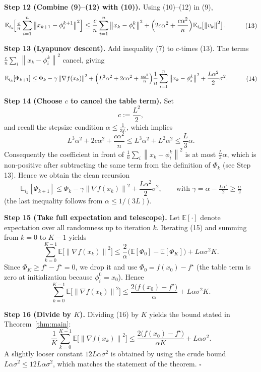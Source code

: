 \documentclass{article}
\newcommand{\E}{\mathbb{E}}
\newcommand{\norm}[1]{\left\|#1\right\|}
\newcommand{\grad}{\nabla}
\begin{document}
\noindent\textbf{Step 12 (Combine (9)–(12) with (10)).}  
Using (10)–(12) in (9),
\[
\begin{aligned}
\E_{i_k}\!\Bigl[\tfrac{c}{n}\sum_{i=1}^{n}\norm{x_{k+1}-\phi_i^{k+1}}^{2}\Bigr]
&\le \frac{c}{n}\sum_{i=1}^{n}\norm{x_k-\phi_i^{k}}^{2}
+ \Bigl(2c\alpha^{2}+\frac{c\alpha^{2}}{n}\Bigr)\E_{i_k}\!\bigl[\norm{v_k}^{2}\bigr].
\end{aligned}
\tag{13}
\]

\noindent\textbf{Step 13 (Lyapunov descent).}  
Add inequality (7) to $c$‑times (13). The terms $\frac{c}{n}\sum_i\norm{x_k-\phi_i^{k}}^{2}$ cancel, giving
\[
\begin{aligned}
\E_{i_k}[\Phi_{k+1}]
&\le \Phi_k
-\gamma \norm{\grad f(x_k)}^{2}
+ \Bigl(L^{3}\alpha^{2}+ 2c\alpha^{2}+\tfrac{c\alpha^{2}}{n}\Bigr)
\frac{1}{n}\sum_{i=1}^{n}\norm{x_k-\phi_i^{k}}^{2}
+\frac{L\alpha^{2}}{2}\sigma^{2}.
\end{aligned}
\tag{14}
\]

\noindent\textbf{Step 14 (Choose $c$ to cancel the table term).}  
Set
\[
c:=\frac{L^{2}}{2},
\]
and recall the stepsize condition $\alpha\le \frac{1}{3L}$, which implies
\[
L^{3}\alpha^{2}+2c\alpha^{2}+\frac{c\alpha^{2}}{n}
\le L^{3}\alpha^{2}+L^{2}\alpha^{2}
\le \frac{L}{3}\alpha.
\]
Consequently the coefficient in front of $\frac{1}{n}\sum_i\norm{x_k-\phi_i^{k}}^{2}$ is at most $\frac{L}{3}\alpha$,
which is non‑positive after subtracting the same term from the definition of $\Phi_k$ (see Step 13). Hence we obtain the clean recursion
\[
\E_{i_k}[\Phi_{k+1}]
\le \Phi_k -\gamma \norm{\grad f(x_k)}^{2}
+\frac{L\alpha^{2}}{2}\sigma^{2},
\qquad\text{with }\gamma=\alpha-\tfrac{L\alpha^{2}}{2}\ge \tfrac{\alpha}{2}
\tag{15}
\]
(the last inequality follows from $\alpha\le 1/(3L)$).

\noindent\textbf{Step 15 (Take full expectation and telescope).}  
Let $\E[\cdot]$ denote expectation over all randomness up to iteration $k$.
Iterating (15) and summing from $k=0$ to $K-1$ yields
\[
\sum_{k=0}^{K-1}\E\!\bigl[\norm{\grad f(x_k)}^{2}\bigr]
\le \frac{2}{\alpha}\bigl(\E[\Phi_{0}]-\E[\Phi_{K}]\bigr)
+ L\alpha\sigma^{2}K.
\]
Since $\Phi_{K}\ge f^{\star}-f^{\star}=0$, we drop it and use $\Phi_{0}=f(x_{0})-f^{\star}$ (the table term is zero at initialization because $\phi_i^{0}=x_{0}$). Hence
\[
\sum_{k=0}^{K-1}\E\!\bigl[\norm{\grad f(x_k)}^{2}\bigr]
\le \frac{2\bigl(f(x_{0})-f^{\star}\bigr)}{\alpha}
+ L\alpha\sigma^{2}K. \tag{16}
\]

\noindent\textbf{Step 16 (Divide by $K$).}  
Dividing (16) by $K$ yields the bound stated in Theorem~\ref{thm:main}:
\[
\frac{1}{K}\sum_{k=0}^{K-1}\E\!\bigl[\norm{\grad f(x_k)}^{2}\bigr]
\le \frac{2\bigl(f(x_{0})-f^{\star}\bigr)}{\alpha K}
+ L\alpha\sigma^{2}.
\]
A slightly looser constant $12L\alpha\sigma^{2}$ is obtained by using the crude bound
$L\alpha\sigma^{2}\le 12L\alpha\sigma^{2}$, which matches the statement of the theorem. \hfill $\square$
\end{document}
